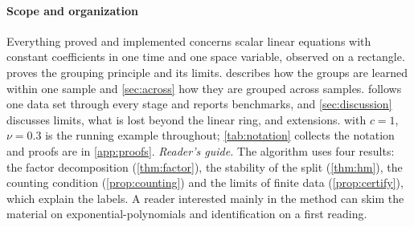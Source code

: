 \paragraph{Scope and organization} Everything proved and implemented concerns scalar linear equations with constant
coefficients in one time and one space variable, observed on a rectangle.  proves the grouping principle
and its limits.  describes how the groups are
learned within one sample and \cref{sec:across} how they are grouped across samples.  follows one data
set through every stage and reports benchmarks, and \cref{sec:discussion} discusses limits, what is lost beyond the linear ring, and extensions. 
with $c=1$, $\nu=0.3$ is the running example throughout; \cref{tab:notation} collects the notation and proofs are in
\cref{app:proofs}. \emph{Reader's guide.} The algorithm uses four results: the factor decomposition (\cref{thm:factor}), the
stability of the split (\cref{thm:hm}), the counting condition (\cref{prop:counting}) and the limits of finite data
(\cref{prop:certify}), which explain the labels. A reader interested mainly in the method can skim the material on
exponential-polynomials and identification on a first reading.



